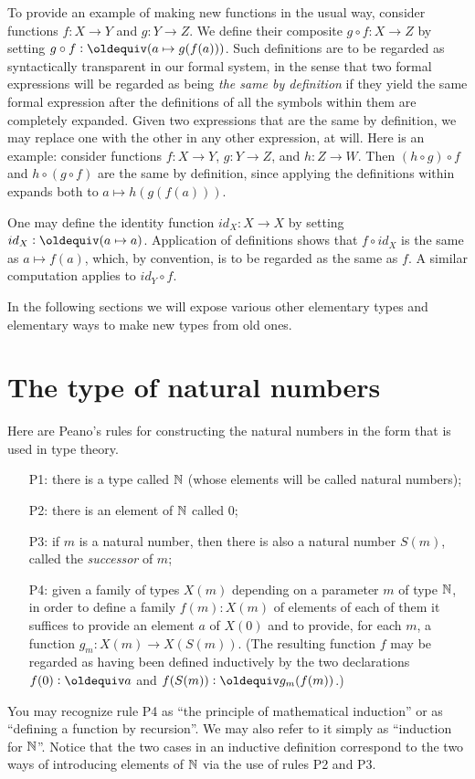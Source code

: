 To provide an example of making new functions in the usual way, consider functions $f : X \to Y$ and $g : Y \to Z$.  We define their composite
$g \circ f : X \to Z$ by setting $g \circ f \defeq (a \mapsto g(f(a)))$.  Such definitions are to be regarded as syntactically transparent in
our formal system, in the sense that two formal expressions will be regarded as being {\em the same by definition} if they yield the same formal
expression after the definitions of all the symbols within them are completely expanded.  Given two expressions that are the same by definition,
we may replace one with the other in any other expression, at will.  Here is an example: consider functions $f : X \to Y$, $g : Y \to Z$, and $h
: Z \to W$.  Then $(h \circ g) \circ f$ and $h \circ (g \circ f)$ are the same by definition, since applying the definitions within expands both
to $a \mapsto h(g(f(a)))$.

One may define the identity function $id_X : X \to X$ by setting $id_X \defeq (a \mapsto a)$.  Application of definitions shows that $f \circ
id_X$ is the same as $a \mapsto f(a)$, which, by convention, is to be regarded as the same as $f$.  A similar computation applies to $id_Y \circ
f$.

In the following sections we will expose various other elementary types and elementary ways to make new types from old ones.

\section{The type of natural numbers}\label{nat}

Here are Peano's rules \citep{peano-principia} for constructing the natural numbers in the form that is used in type theory.
\begin{enumerate}
\item[P1:] there is a type called $\mathbb{N}$ (whose elements will be called natural numbers);
\item[P2:] there is an element of $\mathbb{N}$ called $0$;
\item[P3:] if $m$ is a natural number, then there is also a natural number $S(m)$, called the {\em successor} of $m$;
\item[P4:] given a family of types $X(m)$ depending on a parameter
  $m$ of type $\mathbb{N}$, in order to define a family $f(m) : X(m)$ of elements of each of them it suffices to provide an element $a$ of $X(0)$ and
  to provide, for each $m$, a function $g_m : X(m) \to X(S(m))$.  (The resulting function $f$ may be regarded as having been defined inductively
  by the two declarations $f(0) \defeq a$ and $f(S(m)) \defeq g_m(f(m))$.)
\end{enumerate}
\nopagebreak
You may recognize rule P4 as ``the principle of mathematical induction'' or as ``defining a function by recursion''.  We may also refer to it
simply as ``induction for $\mathbb{N}$''.  Notice that the two cases in an inductive definition correspond to the two ways of introducing elements of
$\mathbb{N}$ via the use of rules P2 and P3.

